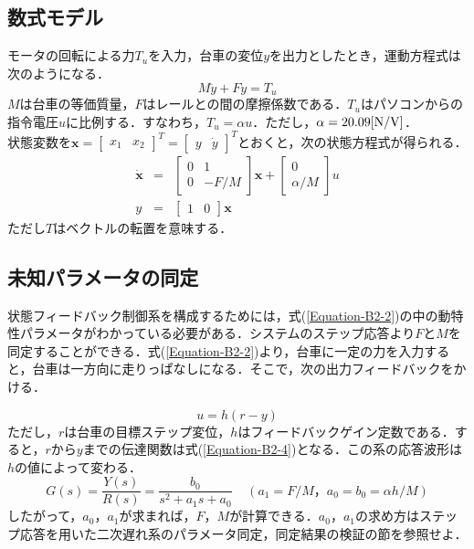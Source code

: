 \documentclass[12pt]{jsarticle}
\begin{document}
\subsection{数式モデル}
モータの回転による力$T_u$を入力，台車の変位$y$を出力としたとき，運動方程式は次のようになる．
\begin{equation}
  \label{Equation-B2-1}
  M\ddot{y} + F\dot{y} = T_u
\end{equation}
$M$は台車の等価質量，$F$はレールとの間の摩擦係数である．$T_u$はパソコンからの指令電圧$u$に比例する．すなわち，$T_u=\alpha u$．ただし，$\alpha = 20.09{\rm [N/V]}$．\\
状態変数を${\bm x}=\left[\begin{array}{cc}x_1 & x_2\end{array}\right]^T = \left[\begin{array}{cc}y & \dot{y}\end{array}\right]^T$とおくと，次の状態方程式が得られる．
\begin{eqnarray}
  \label{Equation-B2-2}
  \dot{\bm x} &=& \left[\begin{array}{cc}0& 1\\0& -F/M\end{array}\right] {\bm x} + \left[\begin{array}{c}0\\\alpha/M\end{array}\right] u \\ \nonumber
  y &=& \left[\begin{array}{cc}1 &0\end{array}\right] {\bm x}
\end{eqnarray}
ただし$T$はベクトルの転置を意味する．
\subsection{未知パラメータの同定}
状態フィードバック制御系を構成するためには，式(\ref{Equation-B2-2})の中の動特性パラメータがわかっている必要がある．システムのステップ応答より$F$と$M$を同定することができる．式(\ref{Equation-B2-2})より，台車に一定の力を入力すると，台車は一方向に走りっぱなしになる．そこで，次の出力フィードバックをかける．

\begin{equation}
  \label{Equation-B2-3}
  u = h(r - y)
\end{equation}
ただし，$r$は台車の目標ステップ変位，$h$はフィードバックゲイン定数である．すると，$r$から$y$までの伝達関数は式(\ref{Equation-B2-4})となる．この系の応答波形は$h$の値によって変わる．
\begin{equation}
  \label{Equation-B2-4}
  G(s) = \frac{Y(s)}{R(s)} = \frac{b_0}{s^2+a_1s+a_0}\;\;\;\;(a_1 =F/M，a_0=b_0=\alpha h /M)
\end{equation}
したがって，$a_0$，$a_1$が求まれば，$F$，$M$が計算できる．$a_0$，$a_1$の求め方はステップ応答を用いた二次遅れ系のパラメータ同定，同定結果の検証の節を参照せよ．
\end{document}
